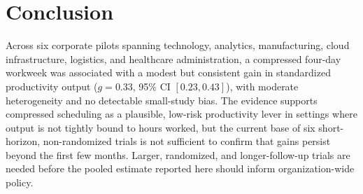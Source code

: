 \section{Conclusion}

Across six corporate pilots spanning technology, analytics, manufacturing, cloud
infrastructure, logistics, and healthcare administration, a compressed four-day workweek was
associated with a modest but consistent gain in standardized productivity output
($g = 0.33$, 95\% CI $[0.23, 0.43]$), with moderate heterogeneity and no detectable
small-study bias. The evidence supports compressed scheduling as a plausible, low-risk
productivity lever in settings where output is not tightly bound to hours worked, but the
current base of six short-horizon, non-randomized trials is not sufficient to confirm that
gains persist beyond the first few months. Larger, randomized, and longer-follow-up trials
are needed before the pooled estimate reported here should inform organization-wide policy.
